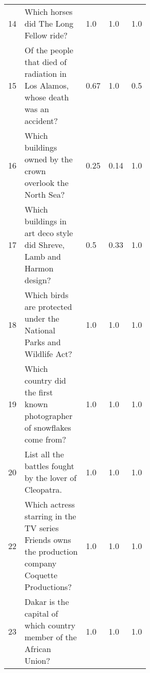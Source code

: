 \begin{table*}[htb!]
\begin{tabular*}{\linewidth}{@{\extracolsep{\fill} } @{}lp{0.55\linewidth}lll@{}}
14          & Which horses did The Long Fellow ride?                                                            & 1.0                & 1.0                & 1.0             \\
\rowcolor[HTML]{9AFF99} 
15          & Of the people that died of radiation in Los Alamos, whose death was an accident?                  & 0.67               & 1.0                & 0.5             \\
\rowcolor[HTML]{BBDAFF} 
16          & Which buildings owned by the crown overlook the North Sea?                                        & 0.25               & 0.14               & 1.0             \\
\rowcolor[HTML]{BBDAFF} 
17          & Which buildings in art deco style did Shreve, Lamb and Harmon design?                             & 0.5                & 0.33               & 1.0             \\
18          & Which birds are protected under the National Parks and Wildlife Act?                              & 1.0                & 1.0                & 1.0             \\
19          & Which country did the first known photographer of snowflakes come from?                           & 1.0                & 1.0                & 1.0             \\
20          & List all the battles fought by the lover of Cleopatra.                                            & 1.0                & 1.0                & 1.0             \\
22          & Which actress starring in the TV series Friends owns the production company Coquette Productions? & 1.0                & 1.0                & 1.0             \\
23          & Dakar is the capital of which country member of the African Union?                                & 1.0                & 1.0                & 1.0             \\ \bottomrule
\end{tabular*}
\label{tab:trainqueries}
\end{table*}
